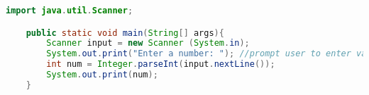 \documentclass{report}
\begin{document}
\begin{lstlisting}[language=Java]
    import java.util.Scanner;

    public static void main(String[] args){
        Scanner input = new Scanner (System.in);
        System.out.print("Enter a number: "); //prompt user to enter value for x
        int num = Integer.parseInt(input.nextLine());
        System.out.print(num);
    }
    \end{lstlisting}
\end{document}
